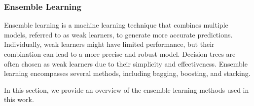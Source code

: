 \subsubsection{Ensemble Learning}
Ensemble learning is a machine learning technique that combines multiple models, referred to as weak learners, to generate more accurate predictions.
Individually, weak learners might have limited performance, but their combination can lead to a more precise and robust model.
Decision trees are often chosen as weak learners due to their simplicity and effectiveness.
Ensemble learning encompasses several methods, including bagging, boosting, and stacking\cite{James2023AnIS}.

In this section, we provide an overview of the ensemble learning methods used in this work.